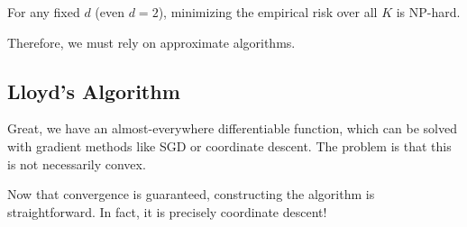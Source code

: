   \begin{theorem}
    For any fixed $d$ (even $d = 2$), minimizing the empirical risk over all $K$ is NP-hard. 
  \end{theorem}

  Therefore, we must rely on approximate algorithms. 

\subsection{Lloyd's Algorithm}

  Great, we have an almost-everywhere differentiable function, which can be solved with gradient methods like SGD or coordinate descent. The problem is that this is not necessarily convex. 

  \begin{theorem}
    
  \end{theorem}
  
  Now that convergence is guaranteed, constructing the algorithm is straightforward. In fact, it is precisely coordinate descent!  

